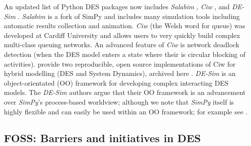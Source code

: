 \documentclass{swpaperproc}
\theoremstyle{sw}
\begin{document}
An updated list of Python DES packages now includes \textit{Salabim} \cite[MIT licensed, last updated September 2024]{van2018salabim}, \textit{Ciw} \cite[MIT licensed; last updated July 2024]{ciw}, and \textit{DE-Sim} \cite[MIT licensed, last updated November 2020]{goldberg2020sim}. \textit{Salabim} is a fork of SimPy and includes many simulation tools including automatic results collection and animation. \textit{Ciw} (the Welsh word for queue) was developed at Cardiff University and allows users to very quickly build complex multi-class queuing networks. An advanced feature of \textit{Ciw} is network deadlock detection (when the DES model enters a state where their is circular blocking of activities).  provide two reproducible, open source implementations of Ciw for hybrid modelling (DES and System Dynamics), archived here \cite{palmer_geraint_2021_4601529}. \textit{DE-Sim} is an object-orientated (OO) framework for developing complex interacting DES models. The \textit{DE-Sim} authors argue that their OO framework is an advancement over \textit{SimPy}'s process-based worldview; although we note that \textit{SimPy} itself is highly flexible and can easily be used within an OO framework; for example see .


\subsection{FOSS: Barriers and initiatives in DES}
\end{document}
